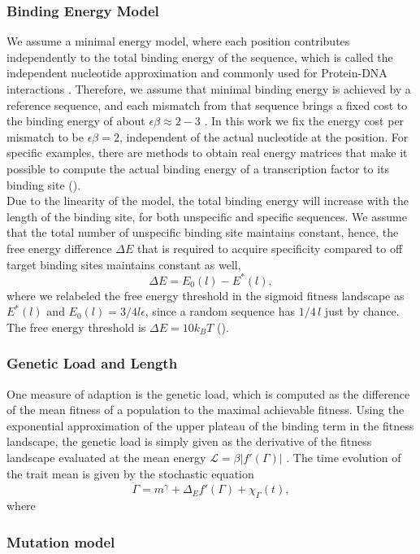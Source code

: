 \subsubsection*{Binding Energy Model}
    We assume a minimal energy model, where each position contributes independently to the total binding energy of the sequence, which is called the independent nucleotide approximation and commonly used for Protein-DNA interactions \cite{stormo1998specificity,djordjevic2007selex}. Therefore, we assume that minimal binding energy is achieved by a reference sequence, and each mismatch from that sequence brings a fixed cost to the binding energy of about $\epsilon\beta\approx 2-3$ \cite{lassig2007}. In this work we fix the energy cost per mismatch to be $\epsilon\beta=2$, independent of the actual nucleotide at the position. For specific examples, there are methods to obtain real energy matrices that make it possible to compute the actual binding energy of a transcription factor to its binding site ().\\
    Due to the linearity of the model, the total binding energy will increase with the length of the binding site, for both unspecific and specific sequences. We assume that the total number of unspecific binding site maintains constant, hence, the free energy difference $\Delta E$ that is required to acquire specificity compared to off target binding sites maintains constant as well,
    \begin{equation}
		\Delta E  = E_0(l) - E^*(l),
	\end{equation}
    where we relabeled the free energy threshold in the sigmoid fitness landscape as $E^*(l)$ and $E_0(l) = 3/4 l\epsilon$, since a random sequence has $1/4\, l$ just by chance. The free energy threshold is $\Delta E=10 k_B T$ ().
    

	\subsubsection*{Genetic Load and Length}
	One measure of adaption is the genetic load, which is computed as the difference of the mean fitness of a population to the maximal achievable fitness. Using the exponential approximation of the upper plateau of the binding term in the fitness landscape, the genetic load is simply given as the derivative of the fitness landscape evaluated at the mean energy $\mathcal{L} = \beta |f'(\Gamma)|$ \cite{held2019}. The time evolution of the trait mean is given by the stochastic equation
	\begin{equation}
		\dot{\Gamma}=m^\gamma+\Delta_E f'(\Gamma)+\chi_\Gamma(t),
    \end{equation}
    where 
	\subsubsection*{Mutation model}